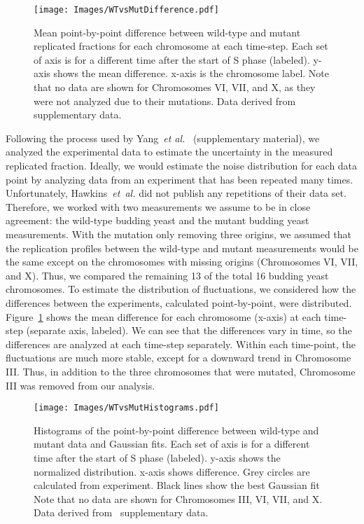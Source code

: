 		\begin{figure}[tbh]
			\begin{center}
				\texttt{[image: Images/WTvsMutDifference.pdf]}
			\end{center}
				\caption[Estimating Experimental Noise A]{\label{fig:MeanDifference} Mean point-by-point difference between wild-type and mutant replicated fractions for each chromosome at each time-step.
					Each set of axis is for a different time after the start of S phase (labeled).
					y-axis shows the mean difference.
					x-axis is the chromosome label.
					Note that no data are shown for Chromosomes VI, VII, and X, as they were not analyzed due to their mutations.
					Data derived from~\cite{StochasticTermination} supplementary data.
				}
		\end{figure}
		
		Following the process used by Yang~\emph{et al.}~\cite{ScottsPaper} (supplementary material), we analyzed the experimental data to estimate the uncertainty in the measured replicated fraction.
		Ideally, we would estimate the noise distribution for each data point by analyzing data from an experiment that has been repeated many times.
		Unfortunately, Hawkins~\emph{et~al.} did not publish any repetitions of their data set.
		Therefore, we worked with two measurements we assume to be in close agreement: the wild-type budding yeast and the mutant budding yeast measurements.
		With the mutation only removing three origins, we assumed that the replication profiles between the wild-type and mutant measurements would be the same except on the chromosomes with missing origins (Chromosomes VI, VII, and X).
		Thus, we compared the remaining 13 of the total 16 budding yeast chromosomes.
		To estimate the distribution of fluctuations, we considered how the differences between the experiments, calculated point-by-point, were distributed.
		Figure~\ref{fig:MeanDifference} shows the mean difference for each chromosome (x-axis) at each time-step (separate axis, labeled).
		We can see that the differences vary in time, so the differences are analyzed at each time-step separately.
		Within each time-point, the fluctuations are much more stable, except for a downward trend in Chromosome III.
		Thus, in addition to the three chromosomes that were mutated, Chromosome III was removed from our analysis.
		
		\begin{figure}[tbh]
			\begin{center}
				\texttt{[image: Images/WTvsMutHistograms.pdf]}
			\end{center}
				\caption[Estimating Experimental Noise B]{\label{fig:HistDifference} Histograms of the point-by-point difference between wild-type and mutant data and Gaussian fits.
					Each set of axis is for a different time after the start of S phase (labeled).
					y-axis shows the normalized distribution.
					x-axis shows difference.
					Grey circles are calculated from experiment.
					Black lines show the best Gaussian fit
					Note that no data are shown for Chromosomes III, VI, VII, and X.
					Data derived from~\cite{StochasticTermination} supplementary data.
				}
		\end{figure}
		
